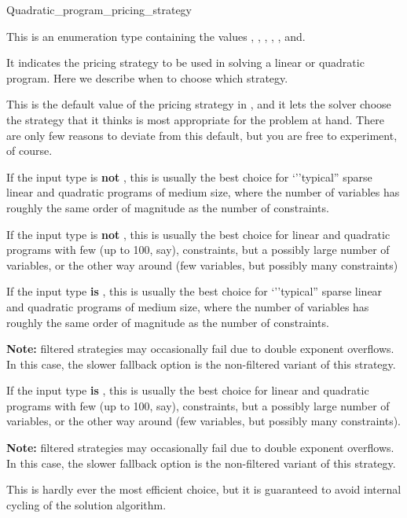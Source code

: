 \begin{ccRefClass}{Quadratic_program_pricing_strategy}


\ccDefinition
This is an enumeration type containing the values
, , 
, ,
, and. 

It indicates the pricing strategy to be used in
solving a linear or quadratic program. Here we describe when to 
choose which strategy.

This is the default value of the pricing strategy in
, and it lets the solver choose the
strategy that it thinks is most appropriate for the problem at hand.
There are only few reasons to deviate from this default, but you are
free to experiment, of course.

If the input type is \textbf{not} , this is usually the best choice
for `''typical'' sparse linear and quadratic programs of medium size,
where the number of variables has roughly the same order of magnitude 
as the number of constraints. 

If the input type is \textbf{not} , this is usually the best choice
for linear and quadratic programs with few (up to 100, say), constraints,
but a possibly large number of variables, or the other way around 
(few variables, but possibly many constraints) 

If the input type \textbf{is} , this is usually the best choice
for `''typical'' sparse linear and quadratic programs of medium size,
where the number of variables has roughly the same order of magnitude 
as the number of constraints. 

{\bf Note:} filtered strategies may occasionally fail due to double 
exponent overflows. In this case, the slower fallback option is
the non-filtered variant  of this strategy.

If the input type \textbf{is} , this is usually the best choice
for linear and quadratic programs with few (up to 100, say), constraints,
but a possibly large number of variables, or the other way around 
(few variables, but possibly many constraints). 

{\bf Note:} filtered strategies may occasionally fail due to double 
exponent overflows. In this case, the slower fallback option is
the non-filtered variant  of this strategy.

This is hardly ever the most efficient choice, but it is guaranteed
to avoid internal cycling of the solution algorithm.

\ccSeeAlso

\end{ccRefClass}
